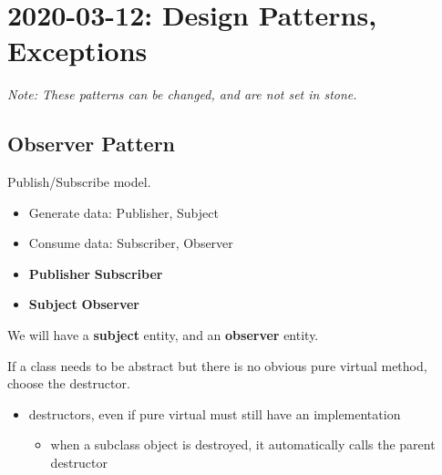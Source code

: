 \section{2020-03-12: Design Patterns, Exceptions}
\emph{Note: These patterns can be changed, and are not set in stone.}
\subsection{Observer Pattern}
Publish/Subscribe model.
\begin{itemize}
      \item Generate data: Publisher, Subject
      \item Consume data: Subscriber, Observer
\end{itemize}
\begin{itemize}
      \item \textbf{Publisher} \textrightarrow{} \textbf{Subscriber}
      \item \textbf{Subject} \textrightarrow{} \textbf{Observer}
\end{itemize}
We will have a \textbf{subject} entity, and an \textbf{observer} entity.

\begin{figure}[H]
      \centering
\end{figure}

If a class needs to be abstract but there is no obvious pure virtual method, choose
the destructor.
\begin{itemize}
      \item destructors, even if pure virtual must still have an implementation
            \begin{itemize}
                  \item when a subclass object is destroyed, it automatically calls the parent
                        destructor
            \end{itemize}
\end{itemize}

